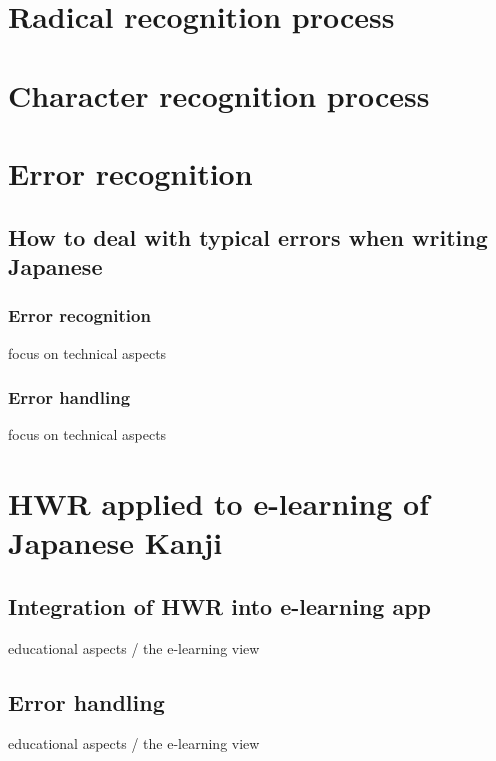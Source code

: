 \section{Radical recognition process}
\section{Character recognition process}

\section{Error recognition}
\subsection{How to deal with typical errors when writing Japanese}
\subsubsection{Error recognition}
focus on technical aspects
\subsubsection{Error handling}
focus on technical aspects

\section{HWR applied to e-learning of Japanese Kanji}
\subsection{Integration of HWR into e-learning app}
educational aspects / the e-learning view
\subsection{Error handling}
educational aspects / the e-learning view
